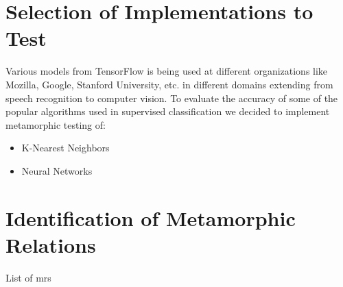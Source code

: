 \section{Selection of Implementations to Test}
Various models from TensorFlow is being used at different organizations like Mozilla, Google, Stanford University, etc. in different domains extending from speech recognition to computer vision. To evaluate the accuracy of some of the popular algorithms used in supervised classification we decided to implement metamorphic testing of:
\begin{itemize}
\item K-Nearest Neighbors
\item Neural Networks
\end{itemize}

\section{Identification of Metamorphic Relations} \label{MRused}
List of mrs

